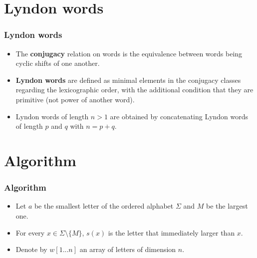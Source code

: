 \documentclass{beamer}
\theoremstyle{definition}
\begin{document}
\section{Lyndon words}
\begin{frame}
\frametitle{Lyndon words}
\begin{itemize}
\item The \textbf{conjugacy} relation on words is the equivalence
between words being cyclic shifts of one another.
\item<2-> \textbf{Lyndon words} are defined as
minimal elements in the conjugacy classes regarding
the lexicographic order, with the additional condition
that they are primitive (not power of another word).
\item<3-> Lyndon words of length $n>1$ are
obtained by concatenating Lyndon words of length $p$
and $q$ with $n = p+q$.

\end{itemize}

\end{frame}

\section{Algorithm}
\begin{frame}
\frametitle{Algorithm}
\begin{itemize}
\item<1->  Let $a$ be the smallest
letter of the ordered alphabet $\Sigma$ and $M$ be the largest one.
\item<2-> For every $x\in \Sigma\setminus\{M\}$, $s(x)$ is the
letter that immediately larger than $x$. 
\item<3-> Denote by
$w[1...n]$ an array of letters of dimension $n$.
\end{itemize}



\end{frame}
\end{document}
